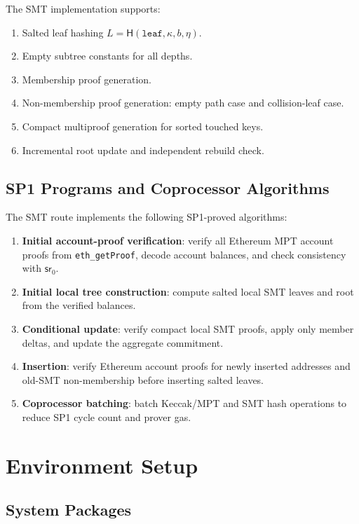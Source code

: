 \documentclass[UTF8,a4paper,11pt]{ctexart}
\newcommand{\Hash}{\mathsf H}
\newcommand{\sr}{\mathsf{sr}}
\begin{document}
The SMT implementation supports:
\begin{enumerate}[leftmargin=2em]
  \item Salted leaf hashing $L=\Hash(\mathtt{leaf},\kappa,b,\eta)$.
  \item Empty subtree constants for all depths.
  \item Membership proof generation.
  \item Non-membership proof generation: empty path case and collision-leaf case.
  \item Compact multiproof generation for sorted touched keys.
  \item Incremental root update and independent rebuild check.
\end{enumerate}


\subsection{SP1 Programs and Coprocessor Algorithms}

The SMT route implements the following SP1-proved algorithms:
\begin{enumerate}[leftmargin=2em]
  \item \textbf{Initial account-proof verification}: verify all Ethereum MPT account proofs from \texttt{eth\_getProof}, decode account balances, and check consistency with $\sr_0$.
  \item \textbf{Initial local tree construction}: compute salted local SMT leaves and root from the verified balances.
  \item \textbf{Conditional update}: verify compact local SMT proofs, apply only member deltas, and update the aggregate commitment.
  \item \textbf{Insertion}: verify Ethereum account proofs for newly inserted addresses and old-SMT non-membership before inserting salted leaves.
  \item \textbf{Coprocessor batching}: batch Keccak/MPT and SMT hash operations to reduce SP1 cycle count and prover gas.
\end{enumerate}

\section{Environment Setup}

\subsection{System Packages}
\end{document}
